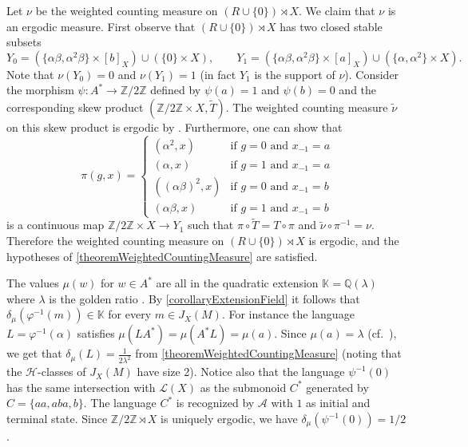\documentclass[a4paper,UKenglish,numberwithinsect,cleveref]{lipics-v2021}
\newcommand{\HH}{\mathrel{\mathscr{H}}}
\newcommand{\A}{\mathcal A}
\newcommand{\Z}{\mathbb{Z}}
\newcommand{\Q}{\mathbb{Q}}
\newcommand{\K}{\mathbb{K}}
\newcommand{\cL}{\mathcal L}
\newcommand*{\from}{\colon}
\begin{document}
\begin{example}
    Let $\nu$ be the weighted counting measure on $(R\cup\{0\})\rtimes X$. We claim that $\nu$ is an ergodic measure. First observe that $(R\cup\{0\})\rtimes X$ has two closed stable subsets
    \[
        Y_0 = (\{\alpha\beta,\alpha^2\beta\}\times [b]_X) \cup (\{0\}\times X),\qquad Y_1 = (\{\alpha\beta,\alpha^2\beta\}\times [a]_X) \cup (\{\alpha,\alpha^2\}\times X).
    \]
    Note that $\nu(Y_0)=0$ and  $\nu(Y_1)=1$ (in fact $Y_1$ is the support of $\nu$). Consider the morphism $\psi\from A^*\to\Z/2\Z$ defined by $\psi(a)=1$ and $\psi(b)=0$ and the corresponding skew product $(\Z/2\Z\times X, \tilde T)$. The weighted counting measure $\tilde\nu$ on this skew product is ergodic by \cite[Corollary 8.12]{BertheGouletOuelletNybergBroddaPerrinPetersen2024}. Furthermore, one can show
    that
    \[
        \pi(g,x)=
        \begin{cases}
            (\alpha^2,x) & \mbox{if $g=0$ and $x_{-1}=a$}\\
            (\alpha,x) & \mbox{if $g=1$ and $x_{-1}=a$}\\
            ((\alpha\beta)^2,x) & \mbox{if $g=0$ and $x_{-1}=b$}\\
            (\alpha\beta,x) & \mbox{if $g=1$ and $x_{-1}=b$}
        \end{cases}
    \]
    is a continuous map $\Z/2\Z\times X\to Y_1$ such that $\pi\circ \tilde T = T\circ\pi$ and
    $\tilde\nu\circ\pi^{-1}=\nu$. Therefore the weighted counting measure on $(R\cup\{0\})\rtimes X$
    is ergodic, and   the hypotheses of \cref{theoremWeightedCountingMeasure} are satisfied.

    The values $\mu(w)$ for $w\in A^*$ are all in the quadratic extension $\K=\Q(\lambda)$ where $\lambda$ is the golden ratio \cite[Theorem 2]{Berthe1996}. By \cref{corollaryExtensionField} it follows that $\delta_\mu(\varphi^{-1}(m))\in \K$ for every $m\in J_X(M)$. For instance the language $L=\varphi^{-1}(\alpha)$ satisfies $\mu(LA^*)=\mu(A^*L)=\mu(a)$. Since $\mu(a) = \lambda$ (cf.\ \cite[Example~3.8.19]{DurandPerrin2021}), we get that $\delta_\mu(L)=\frac{1}{2\lambda^2}$ from \cref{theoremWeightedCountingMeasure} (noting that the $\HH$-classes of $J_X(M)$ have size 2).
    Notice also that the language $\psi^{-1}(0)$ has the same intersection with $\cL(X)$ as the submonoid $C^*$ generated by $C=\{aa,aba,b\}$. The language $C^*$ is recognized by $\A$ with $1$ as initial and terminal state. Since $\Z/2\Z\rtimes X$ is uniquely ergodic, we have $\delta_\mu(\psi^{-1}(0))=1/2$.  
\end{example}
\end{document}
